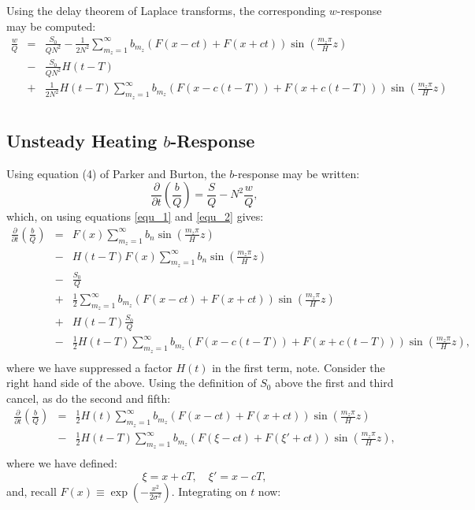 \documentclass[12pt]{article}
\begin{document}
Using the delay theorem of Laplace transforms, the corresponding $w$-response may be computed:
%
\begin{eqnarray}
\label{equ_2}
\frac{w }{Q} & = & \frac{S_0}{Q N^2} - \frac{1}{2 N^2}  \sum_{m_z = 1}^{\infty} b_{m_z} \left(F(x-ct)  + F(x+ct)   \right) \sin \left( \frac{m_z \pi} {H} z\right) \\ \nonumber
& - & \frac{S_0}{Q N^2}  H(t-T) \\ \nonumber
& + & \frac{1}{2 N^2} H(t-T) \sum_{m_z = 1}^{\infty} b_{m_z} \left(F(x-c(t-T)) + F(x+c(t-T))   \right) \sin \left( \frac{m_z \pi} {H} z\right) \\ \nonumber
\end{eqnarray}
%
%
%
\subsection{ Unsteady Heating $b$-Response}
%
Using equation (4) of Parker and Burton, the $b$-response may be written:
%
\begin{equation}
\frac{\partial  }{ \partial t } \left(  \frac{b}{Q} \right) =  \frac{S}{Q} - N^2 \frac{w}{Q},
\end{equation}
%
which, on using equations \ref{equ_1} and \ref{equ_2} gives:
%
\begin{eqnarray}
\frac{\partial  }{\partial t} \left( \frac{b}{Q} \right) & = &  F(x) \sum_{m_z=1}^{\infty} b_n \sin \left( \frac{m_z \pi} {H} z\right) \\ \nonumber
& - & H(t-T) F(x) \sum_{m_z=1}^{\infty} b_n \sin \left( \frac{m_z \pi} {H} z\right) \\ \nonumber
& - & \frac{S_0}{Q} \\ \nonumber 
& +& \frac{1}{2}  \sum_{m_z = 1}^{\infty} b_{m_z} \left(F(x-ct)  + F(x+ct)   \right) \sin \left( \frac{m_z \pi} {H} z\right) \\ \nonumber
& + &H(t-T)  \frac{S_0}{Q}  \\ \nonumber
& - & \frac{1}{2} H(t-T) \sum_{m_z = 1}^{\infty} b_{m_z} \left(F(x-c(t-T)) + F(x+c(t-T))   \right) \sin \left( \frac{m_z \pi} {H} z\right), \\ \nonumber
\end{eqnarray}
%
where we have suppressed a factor $H(t)$ in the first term, note. 
Consider the right hand side of the above. Using the definition of $S_0$ above the first and third cancel, as do the second and fifth:
%
\begin{eqnarray}
\frac{\partial  }{\partial t} \left( \frac{b}{Q} \right) & = & \frac{1}{2} H(t) \sum_{m_z = 1}^{\infty} b_{m_z} \left(F(x-ct) + F(x+ct)   \right) \sin \left( \frac{m_z \pi} {H} z\right) \\ \nonumber
& - & \frac{1}{2} H(t-T) \sum_{m_z = 1}^{\infty} b_{m_z} \left(F(\xi-ct)  + F( \xi'+ct)   \right) \sin \left( \frac{m_z \pi} {H} z\right),  \\ \nonumber
\end{eqnarray}
%
where we have defined: 
%
\begin{equation}
\xi = x + cT, \quad \xi' = x - cT,
\end{equation}
%
and, recall $F(x) \equiv \exp \left( - \frac{x^2}{2 \sigma^2 } \right)$.  Integrating on $t$ now:
\end{document}

